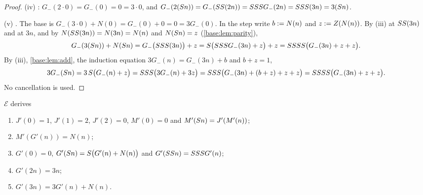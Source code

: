 \begin{proof}
(iv) : $G_-(2\cdot 0)=G_-(0)=0=3\cdot 0$, and
$G_-(2(S n))=G_-(SS(2n))=SSS G_-(2n)=SSS(3n)
 =3(S n)$.

(v) .  The base is $G_-(3\cdot 0)+N(0)=G_-(0)+0=0=3G_-(0)$.  In
the step write $b\mathrel{:=} N(n)$ and $z\mathrel{:=} Z(N(n))$.  By (iii) at
$SS(3n)$ and at $3n$, and by $N(SS(3n))=N(3n)=N(n)$ and
$N(S n)=z$ (\cref{base:lem:parity}),
\[
 G_-(3(S n))+N(S n)
 =G_-\bigl(SSS(3n)\bigr)+z
 =S\bigl(SSS G_-(3n)+z\bigr)+z
 =SSSS\bigl(G_-(3n)+z+z\bigr).
\]
By (iii), \cref{base:lem:add}, the induction equation
$3G_-(n)=G_-(3n)+b$ and $b+z=1$,
\[
 3G_-(S n)=3\,S\bigl(G_-(n)+z\bigr)
 =SSS\bigl(3G_-(n)+3z\bigr)
 =SSS\bigl(G_-(3n)+(b+z)+z+z\bigr)
 =SSSS\bigl(G_-(3n)+z+z\bigr).
\]
No cancellation is used.
\end{proof}

\begin{lemma}
\label{base:lem:ramp46}
$\mathcal E$ derives
\begin{enumerate}[label=\textup{(\roman*)}]
\item $J'(0)=1$, $J'(1)=2$, $J'(2)=0$, $M'(0)=0$ and $M'(S n)=J'(M'(n))$;
\item $M'(G'(n))=N(n)$;
\item $G'(0)=0$, $G'(S n)=S\bigl(G'(n)+N(n)\bigr)$ and
 $G'(SS n)=SSS G'(n)$;
\item $G'(2n)=3n$;
\item $G'(3n)=3G'(n)+N(n)$.
\end{enumerate}
\end{lemma}

